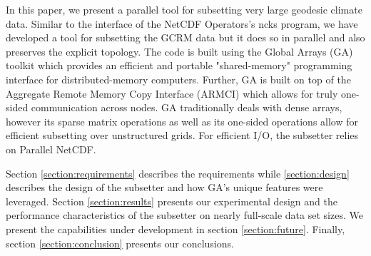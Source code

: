In this paper, we present a parallel tool for subsetting very large geodesic
climate data.  Similar to the interface of the NetCDF Operators's\cite{NCO}
ncks program, we have developed a tool for subsetting the GCRM data but it
does so in parallel and also preserves the explicit topology.  The code is
built using the Global Arrays (GA) toolkit which provides an efficient and
portable "shared-memory" programming interface for distributed-memory
computers.\cite{GA}  Further, GA is built on top of the Aggregate Remote
Memory Copy Interface (ARMCI)\cite{ARMCI} which allows for truly one-sided
communication across nodes.  GA traditionally deals with dense arrays, however
its sparse matrix operations as well as its one-sided operations allow for
efficient subsetting over unstructured grids.  For efficient I/O, the
subsetter relies on Parallel NetCDF.

Section \ref{section:requirements} describes the requirements while
\ref{section:design} describes the design of the subsetter and how GA's unique
features were leveraged.  Section \ref{section:results} presents our
experimental design and the performance characteristics of the subsetter on
nearly full-scale data set sizes.  We present the capabilities under
development in section \ref{section:future}.  Finally, section
\ref{section:conclusion} presents our conclusions.
